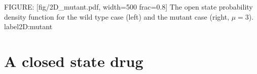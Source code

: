{%





FIGURE: [fig/2D_mutant.pdf, width=500 frac=0.8] The open state probability density function for the wild type case (left) and the mutant case (right, $\mu=3$).  label{2D:mutant}
\section{A closed state drug}

}
